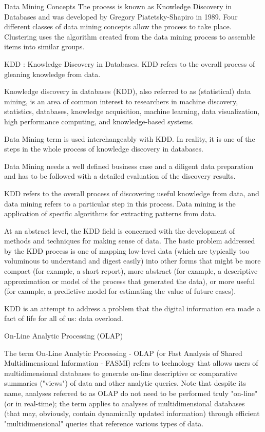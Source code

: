 Data Mining Concepts
The process is known as Knowledge Discovery in Databases and was developed by Gregory Piatetsky-Shapiro in 1989. Four different classes of data mining concepts allow the process to take place. Clustering uses the algorithm created from the data mining process to assemble items into similar groups.



KDD : Knowledge Discovery in Databases.
KDD refers to the overall process of gleaning knowledge from data.

Knowledge discovery in databases (KDD), also referred to as (statistical) data mining, is an area of common interest to researchers in machine discovery, statistics, databases, knowledge acquisition, machine learning, data visualization, high performance computing, and knowledge-based systems.

Data Mining term is used interchangeably with KDD. In reality, it is one of the steps in the whole process of knowledge discovery in databases.

Data Mining needs a well defined business case and a diligent data preparation and has to be followed with a detailed evaluation of the discovery results.

KDD refers to the overall process of discovering useful knowledge from data, and data mining refers to a particular step in this process. Data mining is the application of specific algorithms for extracting patterns from data.

At an abstract level, the KDD field is concerned with the development of methods and techniques for making sense of data. The basic problem addressed by the KDD process is one of mapping low-level data (which are typically too voluminous to understand and digest easily) into other forms that might be more compact (for example, a short report), more abstract (for example, a descriptive approximation or model of the process that generated the data), or more useful (for example, a predictive model for estimating the value of future cases).

KDD is an attempt to address a problem that the digital information era made a fact of life for all of us: data overload.


On-Line Analytic Processing (OLAP)

The term On-Line Analytic Processing - OLAP (or Fast Analysis of Shared Multidimensional Information - FASMI) refers to technology that allows users of multidimensional databases to generate on-line descriptive or comparative summaries ("views") of data and other analytic queries. Note that despite its name, analyses referred to as OLAP do not need to be performed truly "on-line" (or in real-time); the term applies to analyses of multidimensional databases (that may, obviously, contain dynamically updated information) through efficient "multidimensional" queries that reference various types of data. 

